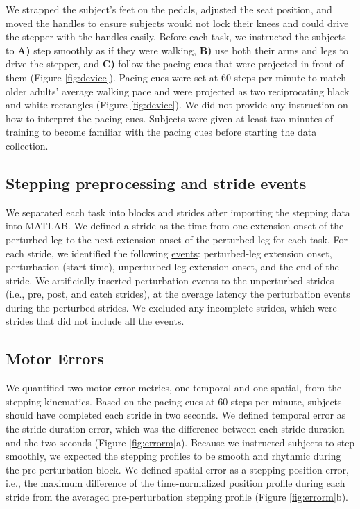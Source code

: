 \documentclass[../thesis_seyed.tex]{subfiles}
\begin{document}
We strapped the subject's feet on the pedals, adjusted the seat position, and moved the handles to ensure subjects would not lock their knees and could drive the stepper with the handles easily. Before each task, we instructed the subjects to \textbf{A)} step smoothly as if they were walking, \textbf{B)} use both their arms and legs to drive the stepper, and \textbf{C)} follow the pacing cues that were projected in front of them (Figure \ref{fig:device}). Pacing cues were set at 60 steps per minute to match older adults' average walking pace \cite{Tudor-Locke2018-gl} and were projected as two reciprocating black and white rectangles (Figure \ref{fig:device}). We did not provide any instruction on how to interpret the pacing cues. Subjects were given at least two minutes of training to become familiar with the pacing cues before starting the data collection.

\subsection{Stepping preprocessing and stride events}
We separated each task into blocks and strides after importing the stepping data into MATLAB. We defined a stride as the time from one extension-onset of the perturbed leg to the next extension-onset of the perturbed leg for each task. For each stride, we identified the following \underline{events}: perturbed-leg extension onset, perturbation (start time), unperturbed-leg extension onset, and the end of the stride. We artificially inserted perturbation events to the unperturbed strides (i.e., pre, post, and catch strides), at the average latency the perturbation events during the perturbed strides. We excluded any incomplete strides, which were strides that did not include all the events.

\subsection{Motor Errors}
We quantified two motor error metrics, one temporal and one spatial, from the stepping kinematics. Based on the pacing cues at 60 steps-per-minute, subjects should have completed each stride in two seconds. We defined temporal error as the stride duration error, which was the difference between each stride duration and the two seconds (Figure \ref{fig:errorm}a). Because we instructed subjects to step smoothly, we expected the stepping profiles to be smooth and rhythmic during the pre-perturbation block. We defined spatial error as a stepping position error, i.e., the maximum difference of the time-normalized position profile during each stride from the averaged pre-perturbation stepping profile (Figure \ref{fig:errorm}b).
\end{document}
